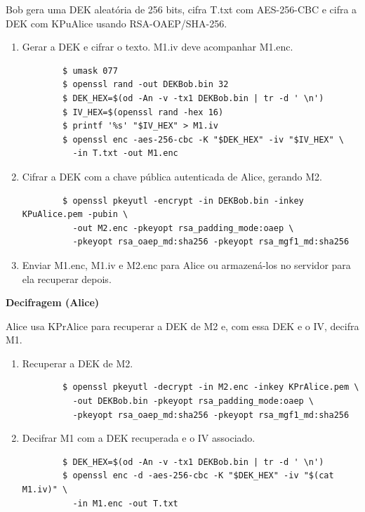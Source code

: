 \documentclass{article}
\begin{document}
Bob gera uma DEK aleatória de 256 bits, cifra T.txt com AES-256-CBC e cifra a DEK com KPuAlice usando RSA-OAEP/SHA-256.
\begin{enumerate}
	\item Gerar a DEK e cifrar o texto. M1.iv deve acompanhar M1.enc.
	\begin{tcolorbox}[width=\textwidth]
	{\small
		\begin{verbatim}
		$ umask 077
		$ openssl rand -out DEKBob.bin 32
		$ DEK_HEX=$(od -An -v -tx1 DEKBob.bin | tr -d ' \n')
		$ IV_HEX=$(openssl rand -hex 16)
		$ printf '%s' "$IV_HEX" > M1.iv
		$ openssl enc -aes-256-cbc -K "$DEK_HEX" -iv "$IV_HEX" \
		  -in T.txt -out M1.enc
		\end{verbatim}
	}
	\end{tcolorbox}

	\item Cifrar a DEK com a chave pública autenticada de Alice, gerando M2.
	\begin{tcolorbox}[width=\textwidth]
	{\small
		\begin{verbatim}
		$ openssl pkeyutl -encrypt -in DEKBob.bin -inkey KPuAlice.pem -pubin \
		  -out M2.enc -pkeyopt rsa_padding_mode:oaep \
		  -pkeyopt rsa_oaep_md:sha256 -pkeyopt rsa_mgf1_md:sha256
		\end{verbatim}
	}
	\end{tcolorbox}

	\item Enviar M1.enc, M1.iv e M2.enc para Alice ou armazená-los no servidor para ela recuperar depois.
\end{enumerate}

\textbf{Decifragem (Alice)}

Alice usa KPrAlice para recuperar a DEK de M2 e, com essa DEK e o IV, decifra M1.
\begin{enumerate}
	\item Recuperar a DEK de M2.
	\begin{tcolorbox}[width=\textwidth]
	{\small
		\begin{verbatim}
		$ openssl pkeyutl -decrypt -in M2.enc -inkey KPrAlice.pem \
		  -out DEKBob.bin -pkeyopt rsa_padding_mode:oaep \
		  -pkeyopt rsa_oaep_md:sha256 -pkeyopt rsa_mgf1_md:sha256
		\end{verbatim}
	}
	\end{tcolorbox}

	\item Decifrar M1 com a DEK recuperada e o IV associado.
	\begin{tcolorbox}[width=\textwidth]
	{\small
		\begin{verbatim}
		$ DEK_HEX=$(od -An -v -tx1 DEKBob.bin | tr -d ' \n')
		$ openssl enc -d -aes-256-cbc -K "$DEK_HEX" -iv "$(cat M1.iv)" \
		  -in M1.enc -out T.txt
		\end{verbatim}
	}
	\end{tcolorbox}
\end{enumerate}
\end{document}
